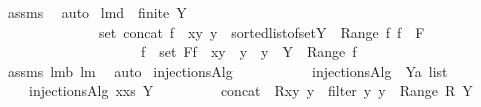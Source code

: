 \begin{isabellebody}
\isamarkupfalse%
\ assms\ \isamarkupfalse%
\ auto%
\endisatagproof
{\isafoldproof}%
%
\isadelimproof
\isanewline
%
\endisadelimproof
\isanewline
{}\isamarkupfalse%
\ lm{}{}d{\isacharcolon}\ \ {\isachardoublequoteopen}finite\ Y{\isachardoublequoteclose}\ \isanewline
\ \ \ \ \ \ \ \ \ \ \ \ \ \ {\isachardoublequoteopen}set\ {\isacharparenleft}concat\ {\isacharbrackleft}{\isacharbrackleft}f\ {\isacharplus}{\isacharasterisk}\ {\isacharbraceleft}{\isacharparenleft}x{\isacharcomma}y{\isacharparenright}{\isacharbraceright}{\isachardot}\ y\ {\isasymleftarrow}\ sorted{\isacharunderscore}list{\isacharunderscore}of{\isacharunderscore}set{\isacharparenleft}Y\ {\isacharminus}\ {\isacharparenleft}Range\ f{\isacharparenright}{\isacharparenright}{\isacharbrackright}{\isachardot}\ f\ {\isasymleftarrow}\ F{\isacharbrackright}{\isacharparenright}\ {\isacharequal}\isanewline
\ \ \ \ \ \ \ \ \ \ \ \ \ \ \ \ \ \ \ {\isacharparenleft}{\isasymUnion}\ f\ {\isasymin}\ set\ F{\isachardot}{\isacharbraceleft}f\ {\isacharplus}{\isacharasterisk}\ {\isacharbraceleft}{\isacharparenleft}x{\isacharcomma}y{\isacharparenright}{\isacharbraceright}\ {\isacharbar}\ y\ {\isachardot}\ y\ {\isasymin}\ Y\ {\isacharminus}\ {\isacharparenleft}Range\ f{\isacharparenright}{\isacharbraceright}{\isacharparenright}{\isachardoublequoteclose}\ \isanewline
%
\isadelimproof
\ \ \ \ \ \ \ \ \ \ \ \ \ %
\endisadelimproof
%
\isatagproof
{}\isamarkupfalse%
\ assms\ lm{}{}b\ lm{}{}\ \isamarkupfalse%
\ auto%
\endisatagproof
{\isafoldproof}%
%
\isadelimproof
%
\endisadelimproof
%
\isamarkuptrue%
\isamarkupfalse%
\ injectionsAlg\ \isanewline
\ \ \ \ \ \isanewline
\ \ \ \ {\isachardoublequoteopen}injectionsAlg\ {\isacharbrackleft}{\isacharbrackright}\ {\isacharparenleft}Y{\isacharcolon}{\isacharcolon}{\isacharprime}a\ list{\isacharparenright}\ {\isacharequal}\ {\isacharbrackleft}{\isacharbraceleft}{\isacharbraceright}{\isacharbrackright}{\isachardoublequoteclose}\ {\isacharbar}\isanewline
\ \ \ \ {\isachardoublequoteopen}injectionsAlg\ {\isacharparenleft}x{\isacharhash}xs{\isacharparenright}\ Y\ {\isacharequal}\ \isanewline
\ \ \ \ \ \ \ concat\ {\isacharbrackleft}\ {\isacharbrackleft}R{\isasymunion}{\isacharbraceleft}{\isacharparenleft}x{\isacharcomma}y{\isacharparenright}{\isacharbraceright}{\isachardot}\ y\ {\isasymleftarrow}\ {\isacharparenleft}filter\ {\isacharparenleft}{\isacharpercent}y{\isachardot}\ y\ {\isasymnotin}\ Range\ R{\isacharparenright}\ Y{\isacharparenright}{\isacharbrackright}\isanewline

\end{isabellebody}
